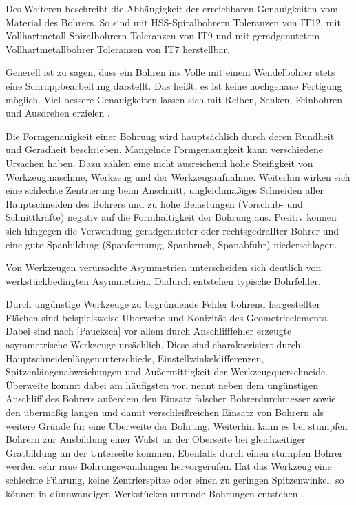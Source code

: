 Des Weiteren beschreibt \cite{Schonherr.2002} die Abhängigkeit der erreichbaren Genauigkeiten vom Material des Bohrers. So sind mit HSS-Spiralbohrern Toleranzen von IT12, mit Vollhartmetall-Spiralbohrern Toleranzen von IT9 und mit geradgenutetem Vollhartmetallbohrer Toleranzen von IT7 herstellbar. 

Generell ist zu sagen, dass ein Bohren ins Volle mit einem Wendelbohrer stets eine Schruppbearbeitung darstellt. Das heißt, es ist keine hochgenaue Fertigung möglich. Viel bessere Genauigkeiten lassen sich mit Reiben, Senken, Feinbohren und Ausdrehen erzielen \cite{Schonherr.2002}.

Die Formgenauigkeit einer Bohrung wird hauptsächlich durch deren Rundheit und Geradheit beschrieben. Mangelnde Formgenauigkeit kann verschiedene Ursachen haben. Dazu zählen eine nicht ausreichend hohe Steifigkeit von Werkzeugmaschine, Werkzeug und der Werkzeugaufnahme. Weiterhin wirken sich eine schlechte Zentrierung beim Anschnitt, ungleichmäßiges Schneiden aller Hauptschneiden des Bohrers und zu hohe Belastungen (Vorschub- und Schnittkräfte) negativ auf die Formhaltigkeit der Bohrung aus. Positiv können sich hingegen die Verwendung geradgenuteter oder rechtsgedrallter Bohrer und eine gute Spanbildung (Spanformung, Spanbruch, Spanabfuhr) niederschlagen. 

Von Werkzeugen verursachte Asymmetrien unterscheiden sich deutlich von werkstückbedingten Asymmetrien. Dadurch entstehen typische Bohrfehler.

Durch ungünstige Werkzeuge zu begründende Fehler bohrend hergestellter Flächen sind beispielsweise Überweite und Konizität des Geometrieelements. Dabei sind nach [Paucksch] vor allem durch Anschlifffehler erzeugte asymmetrische Werkzeuge ursächlich. Diese sind charakterisiert durch Hauptschneidenlängenunterschiede, Einstellwinkeldifferenzen, Spitzenlängenabweichungen und Außermittigkeit der Werkzeugquerschneide.
Überweite kommt dabei am häufigsten vor. \cite{Winkler.1990} nennt neben dem ungünstigen Anschliff des Bohrers außerdem den Einsatz falscher Bohrerdurchmesser sowie den übermäßig langen und damit verschleißreichen Einsatz von Bohrern als weitere Gründe für eine Überweite der Bohrung. 
Weiterhin kann es bei stumpfen Bohrern zur Ausbildung einer Wulst an der Oberseite bei gleichzeitiger Gratbildung an der Unterseite kommen. Ebenfalls durch einen stumpfen Bohrer werden sehr raue Bohrungswandungen hervorgerufen. 
Hat das Werkzeug eine schlechte Führung, keine Zentrierspitze oder einen zu geringen Spitzenwinkel, so können in dünnwandigen Werkstücken unrunde Bohrungen entstehen \cite{Dietrich.2014}.


